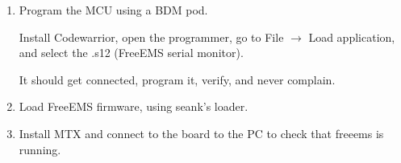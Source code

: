 \documentclass[12pt,a4paper,titlepage]{article}
\begin{document}
\begin{enumerate}
Don't put too much paste for the small regulator, or it will get misaligned.

Components that shouldn't be populated:

\begin{itemize}
\item F1, F3 (Fuses)
\item R226, R227, Q18, Q19, bridge pin 1 and 3 of Q19 (this is the shutdown circuit)
\item R133 (bad pullup)
\item R228 OR R229, using one of them defines whether the XOR negates or not its outputs.
\item If you use VR inputs, R212, R213, R215, and R216 should be bigger, like $\frac{1}{4}$ or $\frac{1}{2}$W. 10k\ohm to 20k\ohm will be fine.
\item U18, R186, R187, C107, D74, D75, C106 (thermocouple driver)
\end{itemize}

\item Program the MCU using a BDM pod.

Install Codewarrior, open the programmer, go to File $\rightarrow$ Load application, and select the .s12 (FreeEMS serial monitor).

It should get connected, program it, verify, and never complain.

\item Load FreeEMS firmware, using seank's loader.

\item Install  MTX and connect to the board to the PC to check that freeems is running.

\end{enumerate}
\end{document}
